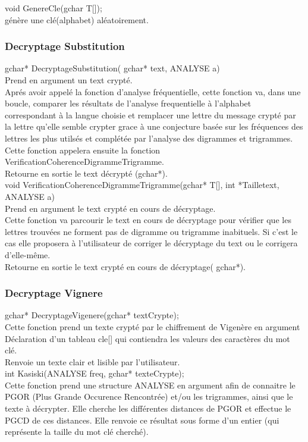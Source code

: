 \documentclass[a4]{article}
\begin{document}
	void GenereCle(gchar T[]);\\
		génère une clé(alphabet) aléatoirement.
	
	\subsubsection{Decryptage Substitution}
	gchar* DecryptageSubstitution( gchar* text, ANALYSE a)\\
		Prend en argument un text crypté.\\
		Aprés avoir appelé la fonction d'analyse fréquentielle, cette fonction va, 
		dans une boucle, comparer les résultats de l'analyse frequentielle à l'alphabet
		 correspondant à la langue choisie et remplacer une lettre du message crypté 
		 par la lettre qu'elle semble crypter grace à une conjecture basée sur les 
		 fréquences des lettres les plus utilsés et complétée par l'analyse des digrammes 
		 et trigrammes. Cette fonction appelera ensuite la fonction VerificationCoherenceDigrammeTrigramme.\\
		Retourne en sortie le text décrypté (gchar*).\\


	void VerificationCoherenceDigrammeTrigramme(gchar* T[], int *Tailletext, ANALYSE a)\\
		Prend en argument le text crypté en cours de décryptage.\\
		Cette fonction va parcourir le text en cours de décryptage pour vérifier que les lettres trouvées 
		ne forment pas de digramme ou trigramme inabituels. Si c'est le cas elle proposera à l'utilisateur 
		de corriger le décryptage du text ou le corrigera d'elle-même.\\
		Retourne en sortie le text crypté en cours de décryptage( gchar*).\\
	
	
	\subsubsection{Decryptage Vignere}
	gchar* DecryptageVigenere(gchar* textCrypte);\\
		Cette fonction prend un texte crypté par le chiffrement de Vigenère en argument
		Déclaration d'un tableau cle[] qui contiendra les valeurs des caractères du mot clé.\\
		Renvoie un texte clair et lisible par l'utilisateur.\\
	
	int Kasiski(ANALYSE freq, gchar* texteCrypte);\\
		Cette fonction prend une structure ANALYSE en argument afin de connaitre le PGOR (Plus Grande Occurence Rencontrée) et/ou les trigrammes, ainsi que le texte à décrypter.
		Elle cherche les différentes distances de PGOR et effectue le PGCD de ces distances.
		Elle renvoie ce résultat sous forme d'un entier (qui représente la taille du mot clé cherché).\\
	
\end{document}
